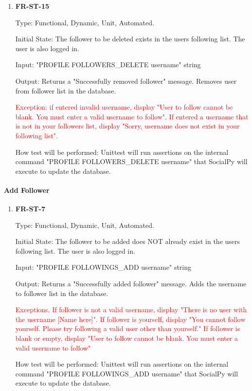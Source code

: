 \documentclass[12pt, titlepage]{article}
\begin{document}
\begin{enumerate}

\item{\textbf{FR-ST-15}}

Type: Functional, Dynamic, Unit, Automated.
					
Initial State: The follower to be deleted exists in the users following list. The user is also logged in.
					
Input: "PROFILE FOLLOWERS\_DELETE username" string
					
Output: Returns a "Successfully removed follower" message. Removes user from follower list in the database.

\textcolor{red}{Exception: if entered invalid username, display "User to follow cannot be blank. You must enter a valid username to follow". If entered a username that is not in your followers list, display "Sorry, username does not exist in your following list".}
					
How test will be performed: Unittest will run assertions on the internal command "PROFILE FOLLOWERS\_DELETE username" that SocialPy will execute to update the database.
\end{enumerate}

\paragraph{Add Follower}

\begin{enumerate}

\item{\textbf{FR-ST-7}}

Type: Functional, Dynamic, Unit, Automated.
					
Initial State: The follower to be added does NOT already exist in the users following list. The user is also logged in.
					
Input: "PROFILE FOLLOWINGS\_ADD username" string
					
Output: Returns a "Successfully added follower" message. Adds the username to follower list in the database.

\textcolor{red}{Exceptions. 
If follower is not a valid username, display "There is no user with the username [Name here]".
If follower is yourself, display "You cannot follow yourself. Please try following a valid user other than yourself."
If follower is blank or empty, display "User to follow cannot be blank. You must enter a valid username to follow"}
					
How test will be performed: Unittest will run assertions on the internal command "PROFILE FOLLOWINGS\_ADD username" that SocialPy will execute to update the database.
\end{enumerate}
\end{document}
